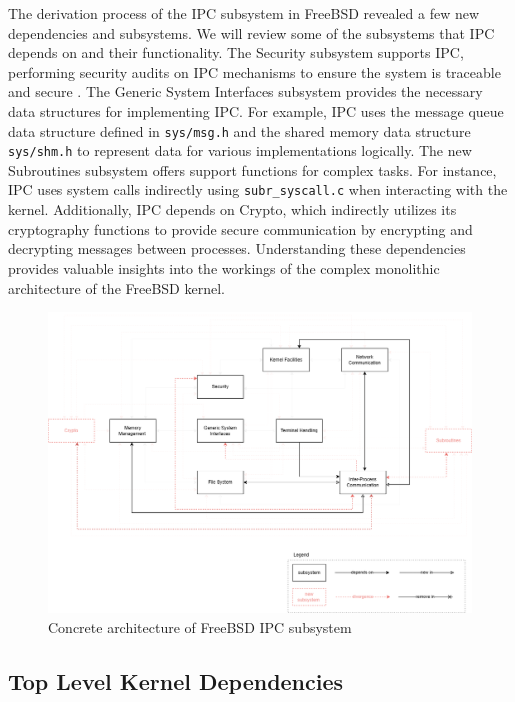 \documentclass[12pt, dvipsnames, a4paper]{article}
\newcommand{\code}[1]{\texttt{#1}}
\begin{document}
The derivation process of the IPC subsystem in FreeBSD revealed a few new dependencies and subsystems. We will review some of the subsystems that IPC depends on and their functionality. The Security subsystem supports IPC, performing security audits on IPC mechanisms to ensure the system is traceable and secure \cite{audit}. The Generic System Interfaces subsystem provides the necessary data structures for implementing IPC. For example, IPC uses the message queue data structure defined in \code{sys/msg.h} and the shared memory data structure \code{sys/shm.h} to represent data for various implementations logically. The new Subroutines subsystem offers support functions for complex tasks. For instance, IPC uses system calls indirectly using \code{subr\_syscall.c} when interacting with the kernel. Additionally, IPC depends on Crypto, which indirectly utilizes its cryptography functions to provide secure communication by encrypting and decrypting messages between processes. Understanding these dependencies provides valuable insights into the workings of the complex monolithic architecture of the FreeBSD kernel.

\begin{figure}[!htb]
	\center
	\includegraphics[width = 390pt]{assets/ipc-concrete-architecture.png}
	\caption{Concrete architecture of FreeBSD IPC subsystem}
\end{figure}
\subsection{Top Level Kernel Dependencies}
\end{document}
